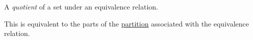 
A \emph{quotient} of a set under an equivalence relation.

This is equivalent to the parts of the \href{doc/1 math/Seven Sketches in Compositionality/1 Chapter 1: Generative Effects/2 What is order/Partition}{partition} associated with the equivalence relation.
